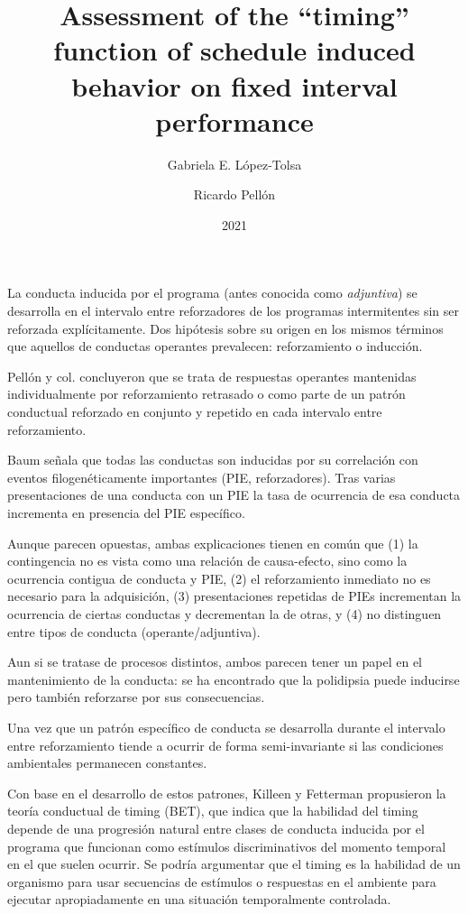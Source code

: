 \documentclass[a4paper,12pt]{article}
\title{Assessment of the ``timing'' function of schedule induced behavior on fixed interval performance}
\author{Gabriela E. López-Tolsa \and Ricardo Pellón}
\date{2021}
\begin{document}
{\scshape\bfseries \maketitle}

La conducta inducida por el programa (antes conocida como {\itshape adjuntiva}) se desarrolla en el intervalo entre reforzadores de los programas intermitentes sin ser reforzada explícitamente. Dos hipótesis sobre su origen en los mismos términos que aquellos de conductas operantes prevalecen: reforzamiento o inducción.

Pellón y col. concluyeron que se trata de respuestas operantes mantenidas individualmente por reforzamiento retrasado o como parte de un patrón conductual reforzado en conjunto y repetido en cada intervalo entre reforzamiento. 

Baum señala que todas las conductas son inducidas por su correlación con eventos filogenéticamente importantes (PIE, reforzadores). Tras varias presentaciones de una conducta con un PIE la tasa de ocurrencia de esa conducta incrementa en presencia del PIE específico.

Aunque parecen opuestas, ambas explicaciones tienen en común que (1) la contingencia no es vista como una relación de causa-efecto, sino como la ocurrencia contigua de conducta y PIE, (2) el reforzamiento inmediato no es necesario para la adquisición, (3) presentaciones repetidas de PIEs incrementan la ocurrencia de ciertas conductas y decrementan la de otras, y (4) no distinguen entre tipos de conducta (operante/adjuntiva).

Aun si se tratase de procesos distintos, ambos parecen tener un papel en el mantenimiento de la conducta: se ha encontrado que la polidipsia puede inducirse pero también reforzarse por sus consecuencias.

Una vez que un patrón específico de conducta se desarrolla durante el intervalo entre reforzamiento tiende a ocurrir de forma semi-invariante si las condiciones ambientales permanecen constantes.

Con base en el desarrollo de estos patrones, Killeen y Fetterman propusieron la teoría conductual de timing (BET), que indica que la habilidad del timing depende de una progresión natural entre clases de conducta inducida por el programa que funcionan como estímulos discriminativos del momento temporal en el que suelen ocurrir. Se podría argumentar que el timing es la habilidad de un organismo para usar secuencias de estímulos o respuestas en el ambiente para ejecutar apropiadamente en una situación temporalmente controlada.
\end{document}
